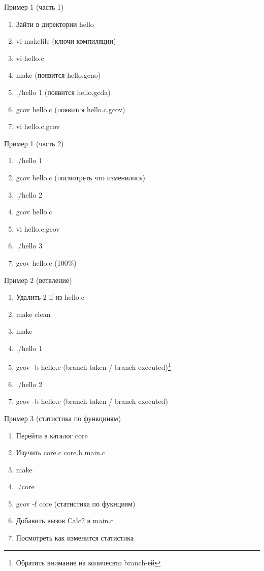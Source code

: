 \begin{frame}{Пример 1 (часть 1)}
  \begin{enumerate}
      \item Зайти в директории hello
      \item vi makefile (ключи компиляции)
      \item vi hello.c 
      \item make (появится hello.gcno)
      \item ./hello 1 (появится hello.gcda)
      \item gcov hello.c (появится hello.c.gcov)
      \item vi hello.c.gcov
  \end{enumerate}
\end{frame}

\begin{frame}{Пример 1 (часть 2)}
  \begin{enumerate}
      \item ./hello 1
      \item gcov hello.c (посмотреть что изменилось)
      \item ./hello 2
      \item gcov hello.c
      \item vi hello.c.gcov 
      \item ./hello 3
      \item gcov hello.c (100\%)
  \end{enumerate}
\end{frame}

\begin{frame}{Пример 2 (ветвление)}
  \begin{enumerate}
      \item Удалить 2 if из hello.c
      \item make clean
      \item make
      \item ./hello 1
      \item gcov -b hello.c (branch taken / branch executed)\footnote{Обратить внимание на количесвто branch-ей}
      \item ./hello 2 
      \item gcov -b hello.c (branch taken / branch executed)
  \end{enumerate}
\end{frame}

\begin{frame}{Пример 3 (статистика по функцииям)}
  \begin{enumerate}
      \item Перейти в каталог core
      \item Изучить core.c core.h main.c
      \item make
      \item ./core
      \item gcov -f core (статистика по фукнциям)
      \item Добавить вызов Calc2 в main.c
      \item Посмотреть как изменится статистика
  \end{enumerate}
\end{frame}

